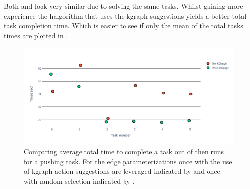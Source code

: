 Both  and  look very similar due to solving the same tasks. Whilst gaining more experience the \ac{halgorithm} that uses the \ac{kgraph} suggestions yields a better total task completion time. Which is easier to see if only the mean of the total tasks times are plotted in . 

\begin{figure}[H]
    \centering
    \includegraphics[width=\textwidth]{figures/results/random_push_time_vs}
    \caption{Comparing average total time to complete a task out of then runs for a pushing task. For the edge parameterizations once with the use of \ac{kgraph} action suggestions are leveraged indicated by  and once with random selection indicated by .}\label{fig:random_push_time_vs}
\end{figure}


